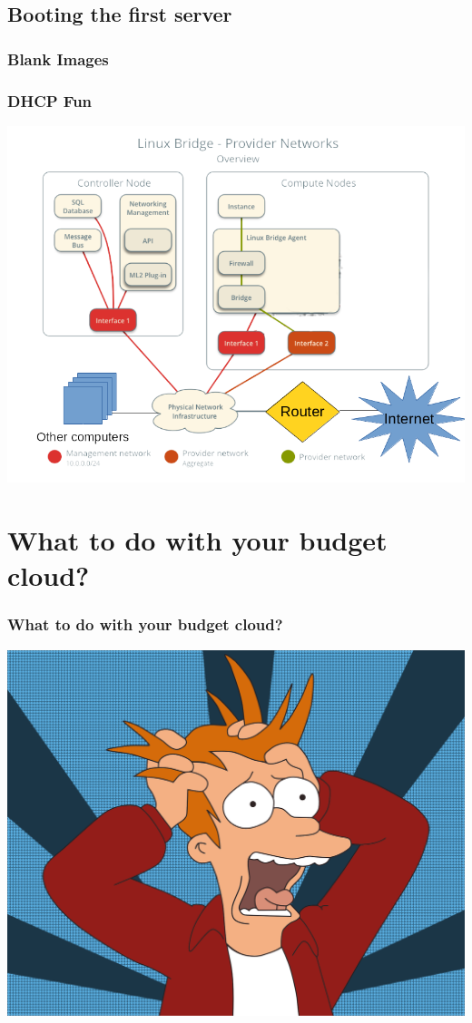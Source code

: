 \documentclass[aspectratio=169,11pt,hyperref={colorlinks=true}]{beamer}
\begin{document}
\subsection{Booting the first server}
\begin{frame}
    
\end{frame}

\begin{frame}
    \frametitle{Blank Images}
    
\end{frame}

\begin{frame}
    \frametitle{DHCP Fun}
    \centering
    \includegraphics[width=.7\textwidth]{network-topology-with-router.png}
\end{frame}



\section{What to do with your budget cloud?}
\begin{frame}
    \frametitle{What to do with your budget cloud?}
    \centering
    \includegraphics[width=.85\textwidth]{futurama-fry.png}
\end{frame}
\end{document}
